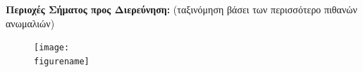 \documentclass[a4paper]{article}
\begin{document}
\newpage

\textbf{Περιοχές Σήματος προς Διερεύνηση:}
(ταξινόμηση βάσει των περισσότερο πιθανών ανωμαλιών)
\bigskip\bigskip

\centering


\begin{figure}[h]
    \centering
	\texttt{[image: \\figurename]}
\end{figure}

\bigskip\bigskip\newpage


\end{document}
